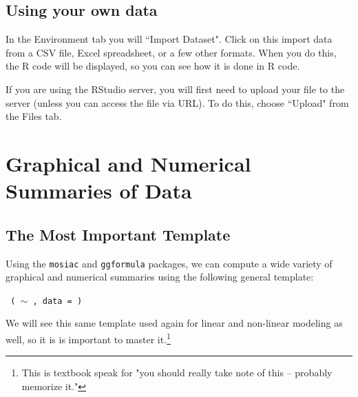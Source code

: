 \documentclass[twoside]{book}\usepackage[]{graphicx}\usepackage[]{xcolor}
\newcommand{\Rindex}[1]{\index{\texttt{#1}}}
\newcommand{\pkg}[1]{{\color{red!80!black}\texttt{#1}}\Rindex{#1}}
\def\R{{\sf R}}
\begin{document}
\subsection{Using your own data}

In the Environment tab you will ``Import Dataset".  Click on this import data 
from a CSV file, Excel spreadsheet, or a few other formats.  When you 
do this, the R code will be displayed, so you can see how it is done in 
\R{} code.

If you are using the RStudio server, you will first need to upload your file to the server (unless you can
access the file via URL).  To do this, choose ``Upload" from the Files tab.


\section{Graphical and Numerical Summaries of Data}

\subsection{The Most Important Template}

Using the \pkg{mosiac} and \pkg{ggformula} packages, 
we can compute a wide variety of graphical and numerical summaries 
using the following general template:

\begin{center}
	\Large 
	\texttt{  (  $\sim$ , data =  ) }
\end{center}
We will see this same template used again for linear and non-linear 
modeling as well, so it is is important to master it.\footnote{This is textbook speak for "you should really 
take note of this -- probably memorize it."}
\end{document}
